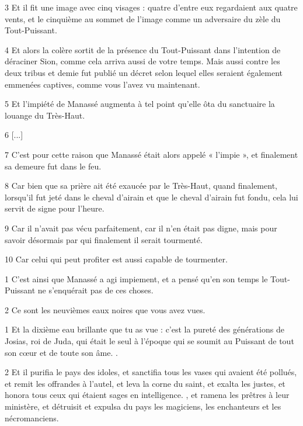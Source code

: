 \par 3 Et il fit une image avec cinq visages : quatre d'entre eux regardaient aux quatre vents, et le cinquième au sommet de l'image comme un adversaire du zèle du Tout-Puissant.

\par 4 Et alors la colère sortit de la présence du Tout-Puissant dans l'intention de déraciner Sion, comme cela arriva aussi de votre temps. Mais aussi contre les deux tribus et demie fut publié un décret selon lequel elles seraient également emmenées captives, comme vous l'avez vu maintenant.

\par 5 Et l'impiété de Manassé augmenta à tel point qu'elle ôta du sanctuaire la louange du Très-Haut.

\par 6 [...]

\par 7 C'est pour cette raison que Manassé était alors appelé « l'impie », et finalement sa demeure fut dans le feu.

\par 8 Car bien que sa prière ait été exaucée par le Très-Haut, quand finalement, lorsqu'il fut jeté dans le cheval d'airain et que le cheval d'airain fut fondu, cela lui servit de signe pour l'heure.

\par 9 Car il n'avait pas vécu parfaitement, car il n'en était pas digne, mais pour savoir désormais par qui finalement il serait tourmenté.

\par 10 Car celui qui peut profiter est aussi capable de tourmenter.


\par 1 C'est ainsi que Manassé a agi impiement, et a pensé qu'en son temps le Tout-Puissant ne s'enquérait pas de ces choses.

\par 2 Ce sont les neuvièmes eaux noires que vous avez vues.


\par 1 Et la dixième eau brillante que tu as vue : c'est la pureté des générations de Josias, roi de Juda, qui était le seul à l'époque qui se soumit au Puissant de tout son cœur et de toute son âme. .

\par 2 Et il purifia le pays des idoles, et sanctifia tous les vases qui avaient été pollués, et remit les offrandes à l'autel, et leva la corne du saint, et exalta les justes, et honora tous ceux qui étaient sages en intelligence. , et ramena les prêtres à leur ministère, et détruisit et expulsa du pays les magiciens, les enchanteurs et les nécromanciens.

